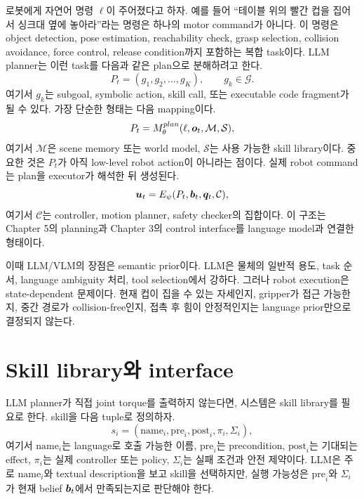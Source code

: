 로봇에게 자연어 명령 $\ell$이 주어졌다고 하자. 예를 들어 ``테이블 위의 빨간 컵을 집어서 싱크대 옆에 놓아라''라는 명령은 하나의 motor command가 아니다. 이 명령은 object detection, pose estimation, reachability check, grasp selection, collision avoidance, force control, release condition까지 포함하는 복합 task이다. LLM planner는 이런 task를 다음과 같은 plan으로 분해하려고 한다.
\begin{equation}
  P_t
  =
  (g_1,g_2,\ldots,g_K),
  \qquad
  g_k \in \mathcal{G}.
  \label{eq:llm-plan-subgoals}
\end{equation}
여기서 $g_k$는 subgoal, symbolic action, skill call, 또는 executable code fragment가 될 수 있다. 가장 단순한 형태는 다음 mapping이다.
\begin{equation}
  P_t
  =
  M_{\theta}^{plan}(\ell,\bm{o}_t,\mathcal{M},\mathcal{S}),
  \label{eq:llm-planner-map}
\end{equation}
여기서 $\mathcal{M}$은 scene memory 또는 world model, $\mathcal{S}$는 사용 가능한 skill library이다. 중요한 것은 $P_t$가 아직 low-level robot action이 아니라는 점이다. 실제 robot command는 plan을 executor가 해석한 뒤 생성된다.
\begin{equation}
  \bm{u}_t
  =
  E_{\psi}(P_t,\bm{b}_t,\bm{q}_t,\mathcal{C}),
  \label{eq:plan-to-control}
\end{equation}
여기서 $\mathcal{C}$는 controller, motion planner, safety checker의 집합이다. 이 구조는 Chapter 5의 planning과 Chapter 3의 control interface를 language model과 연결한 형태이다.

이때 LLM/VLM의 장점은 semantic prior이다. LLM은 물체의 일반적 용도, task 순서, language ambiguity 처리, tool selection에서 강하다. 그러나 robot execution은 state-dependent 문제이다. 현재 컵이 집을 수 있는 자세인지, gripper가 접근 가능한지, 중간 경로가 collision-free인지, 접촉 후 힘이 안정적인지는 language prior만으로 결정되지 않는다.

\section{Skill library와 interface}

LLM planner가 직접 joint torque를 출력하지 않는다면, 시스템은 skill library를 필요로 한다. skill을 다음 tuple로 정의하자.
\begin{equation}
  s_i
  =
  (\mathrm{name}_i,\mathrm{pre}_i,\mathrm{post}_i,\pi_i,\Sigma_i),
  \label{eq:skill-tuple}
\end{equation}
여기서 $\mathrm{name}_i$는 language로 호출 가능한 이름, $\mathrm{pre}_i$는 precondition, $\mathrm{post}_i$는 기대되는 effect, $\pi_i$는 실제 controller 또는 policy, $\Sigma_i$는 실패 조건과 안전 제약이다. LLM은 주로 $\mathrm{name}_i$와 textual description을 보고 skill을 선택하지만, 실행 가능성은 $\mathrm{pre}_i$와 $\Sigma_i$가 현재 belief $\bm{b}_t$에서 만족되는지로 판단해야 한다.

